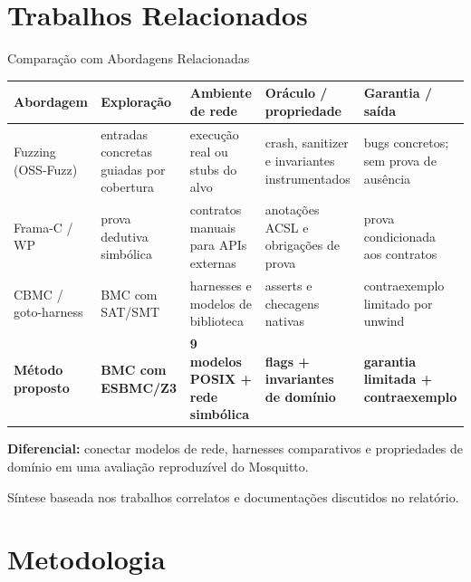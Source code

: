 \documentclass[10pt,aspectratio=169]{beamer}
\begin{document}
\section{Trabalhos Relacionados}

\begin{frame}{Compara\c{c}\~ao com Abordagens Relacionadas}
    \scriptsize
    \setlength{\tabcolsep}{3pt}
    \renewcommand{\arraystretch}{1.22}
    \begin{tabular}{L{2.25cm}L{2.25cm}L{2.85cm}L{3.0cm}L{2.55cm}}
        \toprule
        Abordagem & Explora\c{c}\~ao & Ambiente de rede & Or\'aculo / propriedade & Garantia / sa\'ida \\
        \midrule
        Fuzzing (OSS-Fuzz) & entradas concretas guiadas por cobertura & execu\c{c}\~ao real ou stubs do alvo & crash, sanitizer e invariantes instrumentados & bugs concretos; sem prova de aus\^encia \\
        Frama-C / WP & prova dedutiva simb\'olica & contratos manuais para APIs externas & anota\c{c}\~oes ACSL e obriga\c{c}\~oes de prova & prova condicionada aos contratos \\
        CBMC / goto-harness & BMC com SAT/SMT & harnesses e modelos de biblioteca & asserts e checagens nativas & contraexemplo limitado por unwind \\
        \alert{\textbf{M\'etodo proposto}} & \textbf{BMC com ESBMC/Z3} & \textbf{9 modelos POSIX + rede simb\'olica} & \textbf{flags + invariantes de dom\'inio} & \textbf{garantia limitada + contraexemplo} \\
        \bottomrule
    \end{tabular}

    \vspace{0.5em}
    \small \textbf{Diferencial:} conectar modelos de rede, harnesses comparativos
    e propriedades de dom\'inio em uma avalia\c{c}\~ao reproduz\'ivel do Mosquitto.

    \vspace{0.2em}
    \tiny S\'intese baseada nos trabalhos correlatos e documenta\c{c}\~oes discutidos no relat\'orio.
\end{frame}

\section{Metodologia}
\end{document}
